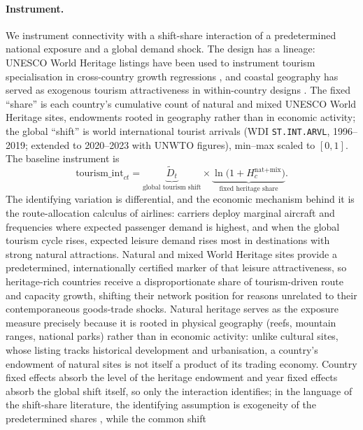 \paragraph{Instrument.} We instrument connectivity with a shift-share
interaction of a predetermined national exposure and a global demand shock.
The design has a lineage: UNESCO World Heritage listings have been used to
instrument tourism specialisation in cross-country growth regressions
\citep{Arezki_2009}, and coastal geography has served as exogenous tourism
attractiveness in within-country designs \citep{Faber_2019}. The fixed
``share'' is each country's cumulative count of natural and mixed
UNESCO World Heritage sites, endowments rooted in geography rather than in
economic activity; the global ``shift'' is world international tourist
arrivals (WDI \texttt{ST.INT.ARVL}, 1996--2019; extended to 2020--2023 with
UNWTO figures), min--max scaled to $[0,1]$. The baseline instrument is
\begin{equation}
\text{tourism\_int}_{ct}
= \underbrace{\widetilde{D}_t}_{\text{global tourism shift}}
\times \underbrace{\ln\!\bigl(1+H_c^{\text{nat+mix}}\bigr)}_{\text{fixed heritage share}}.
\label{eq:instr}
\end{equation}
The identifying variation is differential, and the economic mechanism
behind it is the route-allocation calculus of airlines: carriers deploy
marginal aircraft and frequencies where expected passenger demand is
highest, and when the global tourism cycle rises, expected leisure demand
rises most in destinations with strong natural attractions. Natural and
mixed World Heritage sites provide a predetermined, internationally
certified marker of that leisure attractiveness, so heritage-rich countries
receive a disproportionate share of tourism-driven route and capacity
growth, shifting their network position for reasons unrelated to their
contemporaneous goods-trade shocks. Natural heritage serves as the exposure
measure precisely because it is rooted in physical geography (reefs,
mountain ranges, national parks) rather than in economic activity: unlike
cultural sites, whose listing tracks historical development and
urbanisation, a country's endowment of natural sites is not itself a
product of its trading economy. Country fixed effects absorb the level
of the heritage endowment and year fixed effects absorb the global shift
itself, so only the interaction identifies; in the language of the
shift-share literature, the identifying assumption is exogeneity of the
predetermined shares \citep{GoldsmithPinkham_2020}, while the common shift
